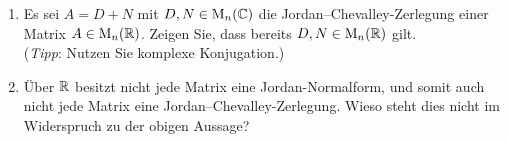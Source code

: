 \documentclass[a4paper, 10pt]{scrartcl}
\begin{document}
\begin{question}
  \begin{enumerate}
    \item
      Es sei $A = D + N$ mit $D, N \in \operatorname{M}_{n}(\mathbb{C})$ die Jordan--Chevalley-Zerlegung einer Matrix $A \in \operatorname{M}_{n}(\mathbb{R})$.
      Zeigen Sie, dass bereits $D, N \in \operatorname{M}_{n}(\mathbb{R})$ gilt.
      \\
      (\emph{Tipp}:
       Nutzen Sie komplexe Konjugation.)
    \item
      Über $\mathbb{R}$ besitzt nicht jede Matrix eine Jordan-Normalform, und somit auch nicht jede Matrix eine Jordan--Chevalley-Zerlegung.
      Wieso steht dies nicht im Widerspruch zu der obigen Aussage?
  \end{enumerate}
\end{question}
\end{document}
